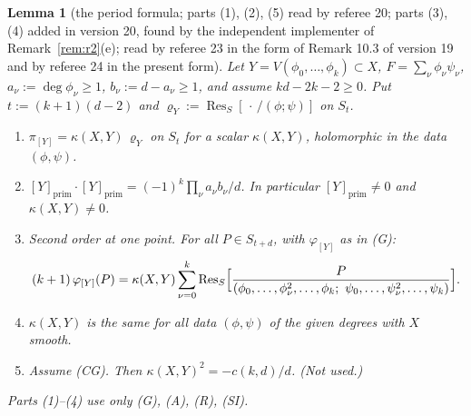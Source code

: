 \documentclass[11pt]{article}
\numberwithin{equation}{section}
\newtheorem{lemma}[theorem]{Lemma}
\theoremstyle{remark}
\newcommand{\Res}{\operatorname{Res}}
\begin{document}
\begin{lemma}[the period formula; parts (1), (2), (5) read by referee 20; parts (3), (4) added in version 20,
found by the independent implementer of Remark~\ref{rem:r2}(e); read by referee 23 in the form of Remark 10.3 of
version 19 and by referee 24 in the present form]\label{lem:PF}
Let $Y=V(\phi_0,\dots,\phi_k)\subset X$, $F=\sum_\nu\phi_\nu\psi_\nu$, $a_\nu:=\deg\phi_\nu\ge1$,
$b_\nu:=d-a_\nu\ge1$, and assume $kd-2k-2\ge0$. Put $t:=(k+1)(d-2)$ and $\varrho_Y:=\Res_S[\,\cdot\,/(\phi;\psi)]$ on $S_t$.
\begin{enumerate}
\item $\pi_{[Y]}=\kappa(X,Y)\,\varrho_Y$ on $S_t$ for a scalar $\kappa(X,Y)$, holomorphic in the data $(\phi,\psi)$.
\item $[Y]_{\mathrm{prim}}\cdot[Y]_{\mathrm{prim}}=(-1)^k\prod_\nu a_\nu b_\nu/d$. In particular
$[Y]_{\mathrm{prim}}\ne0$ and $\kappa(X,Y)\ne0$.
\item \emph{Second order at one point.} For all $P\in S_{t+d}$, with $\varphi_{[Y]}$ as in \textup{(G)}:
\begin{equation}\label{eq:pw}
(k+1)\,\varphi_{[Y]}(P)=\kappa(X,Y)\sum_{\nu=0}^{k}
\Res_S\Bigl[\frac{P}{(\phi_0,\dots,\phi_\nu^2,\dots,\phi_k;\ \psi_0,\dots,\psi_\nu^2,\dots,\psi_k)}\Bigr].
\end{equation}
\item $\kappa(X,Y)$ is the same for all data $(\phi,\psi)$ of the given degrees with $X$ smooth.
\item Assume \textup{(CG)}. Then $\kappa(X,Y)^2=-c(k,d)/d$. (Not used.)
\end{enumerate}
Parts \textup{(1)--(4)} use only \textup{(G)}, \textup{(A)}, \textup{(R)}, \textup{(SI)}.
\end{lemma}
\end{document}
